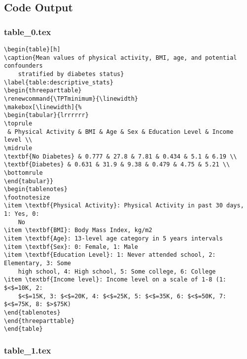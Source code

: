 \documentclass[11pt]{article}
\begin{document}
\subsection{Code Output}

\subsubsection*{table\_0.tex}

\begin{Verbatim}[tabsize=4]
\begin{table}[h]
\caption{Mean values of physical activity, BMI, age, and potential confounders
	stratified by diabetes status}
\label{table:descriptive_stats}
\begin{threeparttable}
\renewcommand{\TPTminimum}{\linewidth}
\makebox[\linewidth]{%
\begin{tabular}{lrrrrrr}
\toprule
 & Physical Activity & BMI & Age & Sex & Education Level & Income level \\
\midrule
\textbf{No Diabetes} & 0.777 & 27.8 & 7.81 & 0.434 & 5.1 & 6.19 \\
\textbf{Diabetes} & 0.631 & 31.9 & 9.38 & 0.479 & 4.75 & 5.21 \\
\bottomrule
\end{tabular}}
\begin{tablenotes}
\footnotesize
\item \textbf{Physical Activity}: Physical Activity in past 30 days, 1: Yes, 0:
	No
\item \textbf{BMI}: Body Mass Index, kg/m2
\item \textbf{Age}: 13-level age category in 5 years intervals
\item \textbf{Sex}: 0: Female, 1: Male
\item \textbf{Education Level}: 1: Never attended school, 2: Elementary, 3: Some
	high school, 4: High school, 5: Some college, 6: College
\item \textbf{Income level}: Income level on a scale of 1-8 (1: $<$=10K, 2:
	$<$=15K, 3: $<$=20K, 4: $<$=25K, 5: $<$=35K, 6: $<$=50K, 7: $<$=75K, 8: $>$75K)
\end{tablenotes}
\end{threeparttable}
\end{table}

\end{Verbatim}

\subsubsection*{table\_1.tex}
\end{document}
